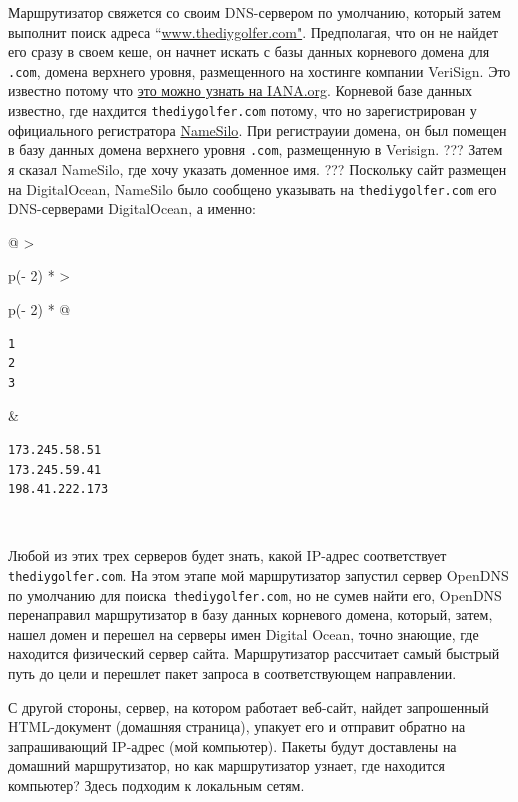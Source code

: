 \documentclass{article}
\begin{document}
Маршрутизатор свяжется со своим DNS-сервером по умолчанию, который затем
выполнит поиск адреса
``\href{http://www.thediygolfer.com}{www.thediygolfer.com"}.
Предполагая, что он не найдет его сразу в своем кеше, он начнет искать с
базы данных корневого домена для \texttt{.com}, домена верхнего уровня,
размещенного на хостинге компании VeriSign. Это известно потому что
\href{https://www.iana.org/domains/root/db/com.html}{это можно узнать на
IANA.org}. Корневой базе данных известно, где нахдится
\texttt{thediygolfer.com} потому, что но зарегистрирован у официального
регистратора
\href{https://www.namesilo.com/register.php?rid=21c9e40dd}{NameSilo}.
При регистрауии домена, он был помещен в базу данных домена верхнего
уровня \texttt{.com}, размещенную в Verisign. ??? Затем я сказал
NameSilo, где хочу указать доменное имя. ??? Поскольку сайт размещен на
DigitalOcean, NameSilo было сообщено указывать на
\texttt{thediygolfer.com} его DNS-серверами DigitalOcean, а именно:

\begin{longtable}[]{@{}
  >{\raggedright\arraybackslash}p{(\columnwidth - 2\tabcolsep) * }
  >{\raggedright\arraybackslash}p{(\columnwidth - 2\tabcolsep) * }@{}}
\toprule
\endhead
\begin{minipage}[t]{\linewidth}\raggedright
\begin{verbatim}
1
2
3
\end{verbatim}
\end{minipage} & \begin{minipage}[t]{\linewidth}\raggedright
\begin{verbatim}
173.245.58.51
173.245.59.41
198.41.222.173
\end{verbatim}
\end{minipage} \\ \addlinespace
\bottomrule
\end{longtable}

Любой из этих трех серверов будет знать, какой IP-адрес соответствует
\texttt{thediygolfer.com}. На этом этапе мой маршрутизатор запустил
сервер OpenDNS по умолчанию для поиска\texttt{\ thediygolfer.com}, но не
сумев найти его, OpenDNS перенаправил маршрутизатор в базу данных
корневого домена, который, затем, нашел домен и перешел на серверы имен
Digital Ocean, точно знающие, где находится физический сервер сайта.
Маршрутизатор рассчитает самый быстрый путь до цели и перешлет пакет
запроса в соответствующем направлении.

С другой стороны, сервер, на котором работает веб-сайт, найдет
запрошенный HTML-документ (домашняя страница), упакует его и отправит
обратно на запрашивающий IP-адрес (мой компьютер). Пакеты будут
доставлены на домашний маршрутизатор, но как маршрутизатор узнает, где
находится компьютер? Здесь подходим к локальным сетям.
\end{document}
